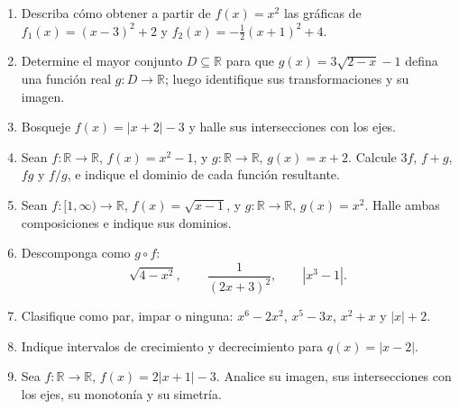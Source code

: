 \begin{ejercicios}
\begin{enumerate}
  \item Describa cómo obtener a partir de $f(x)=x^2$ las gráficas de $f_1(x)=(x-3)^2+2$ y $f_2(x)=-\tfrac12(x+1)^2+4$.
  \item Determine el mayor conjunto $D\subseteq\mathbb{R}$ para que $g(x)=3\sqrt{2-x}-1$ defina una función real $g:D\to\mathbb{R}$; luego identifique sus transformaciones y su imagen.
  \item Bosqueje $f(x)=|x+2|-3$ y halle sus intersecciones con los ejes.
  \item Sean $f:\mathbb{R}\to\mathbb{R}$, $f(x)=x^2-1$, y $g:\mathbb{R}\to\mathbb{R}$, $g(x)=x+2$. Calcule $3f$, $f+g$, $fg$ y $f/g$, e indique el dominio de cada función resultante.
  \item Sean $f:[1,\infty)\to\mathbb{R}$, $f(x)=\sqrt{x-1}$, y $g:\mathbb{R}\to\mathbb{R}$, $g(x)=x^2$. Halle ambas composiciones e indique sus dominios.
  \item Descomponga como $g\circ f$:
  \[
  \sqrt{4-x^2},\qquad \frac{1}{(2x+3)^2},\qquad |x^3-1|.
  \]
  \item Clasifique como par, impar o ninguna: $x^6-2x^2$, $x^5-3x$, $x^2+x$ y $|x|+2$.
  \item Indique intervalos de crecimiento y decrecimiento para $q(x)=|x-2|$.
  \item Sea $f:\mathbb{R}\to\mathbb{R}$, $f(x)=2|x+1|-3$. Analice su imagen, sus intersecciones con los ejes, su monotonía y su simetría.
\end{enumerate}
\end{ejercicios}

